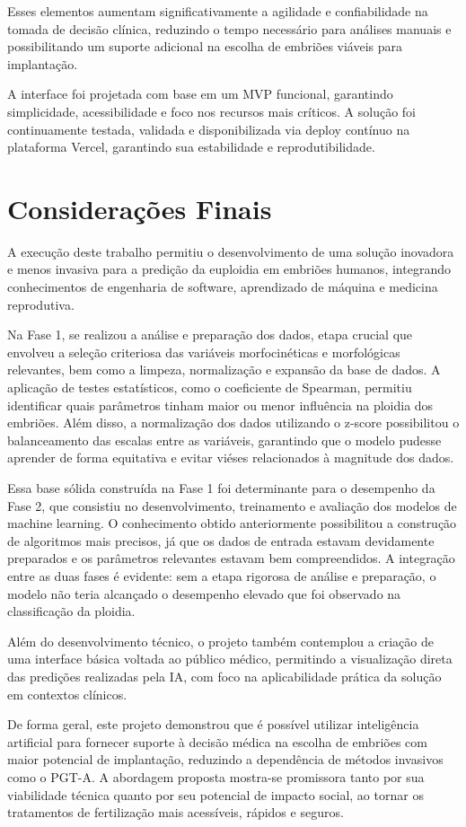Esses elementos aumentam significativamente a agilidade e confiabilidade na tomada de decisão clínica, reduzindo o tempo necessário para análises manuais e possibilitando um suporte adicional na escolha de embriões viáveis para implantação.

A interface foi projetada com base em um MVP funcional, garantindo simplicidade, acessibilidade e foco nos recursos mais críticos. A solução foi continuamente testada, validada e disponibilizada via deploy contínuo na plataforma Vercel, garantindo sua estabilidade e reprodutibilidade.

\section{Considerações Finais}

A execução deste trabalho permitiu o desenvolvimento de uma solução inovadora e menos invasiva para a predição da euploidia em embriões humanos, integrando conhecimentos de engenharia de software, aprendizado de máquina e medicina reprodutiva.

Na Fase 1, se realizou a análise e preparação dos dados, etapa crucial que envolveu a seleção criteriosa das variáveis morfocinéticas e morfológicas relevantes, bem como a limpeza, normalização e expansão da base de dados. A aplicação de testes estatísticos, como o coeficiente de Spearman, permitiu identificar quais parâmetros tinham maior ou menor influência na ploidia dos embriões. Além disso, a normalização dos dados utilizando o z-score possibilitou o balanceamento das escalas entre as variáveis, garantindo que o modelo pudesse aprender de forma equitativa e evitar viéses relacionados à magnitude dos dados.

Essa base sólida construída na Fase 1 foi determinante para o desempenho da Fase 2, que consistiu no desenvolvimento, treinamento e avaliação dos modelos de machine learning. O conhecimento obtido anteriormente possibilitou a construção de algoritmos mais precisos, já que os dados de entrada estavam devidamente preparados e os parâmetros relevantes estavam bem compreendidos. A integração entre as duas fases é evidente: sem a etapa rigorosa de análise e preparação, o modelo não teria alcançado o desempenho elevado que foi observado na classificação da ploidia.

Além do desenvolvimento técnico, o projeto também contemplou a criação de uma interface básica voltada ao público médico, permitindo a visualização direta das predições realizadas pela IA, com foco na aplicabilidade prática da solução em contextos clínicos.

De forma geral, este projeto demonstrou que é possível utilizar inteligência artificial para fornecer suporte à decisão médica na escolha de embriões com maior potencial de implantação, reduzindo a dependência de métodos invasivos como o PGT-A. A abordagem proposta mostra-se promissora tanto por sua viabilidade técnica quanto por seu potencial de impacto social, ao tornar os tratamentos de fertilização mais acessíveis, rápidos e seguros.